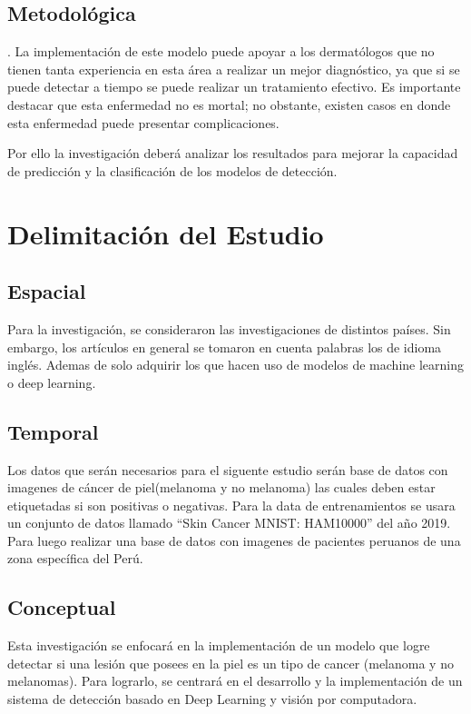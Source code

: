 \subsection{Metodológica}. 
La implementación de este modelo puede apoyar a los dermatólogos que no tienen tanta experiencia en esta área a realizar un mejor diagnóstico, ya que si se puede detectar a tiempo se puede realizar un tratamiento efectivo. Es importante destacar que esta enfermedad no es mortal; no obstante, existen casos en donde esta enfermedad puede presentar complicaciones. 

Por ello la investigación deberá analizar los resultados para mejorar la capacidad de predicción y la clasificación de los modelos de detección.

\section{Delimitación del Estudio}

\subsection{Espacial}
Para la investigación, se consideraron las investigaciones de distintos países. Sin embargo, los artículos en general se tomaron en cuenta palabras los de idioma inglés. Ademas de solo adquirir los que hacen uso de modelos de machine learning o deep learning.

\subsection{Temporal}
Los datos que serán necesarios para el siguente estudio serán base de datos con imagenes de cáncer de piel(melanoma y no melanoma) las cuales deben estar etiquetadas si son positivas o negativas.
Para la data de entrenamientos se usara un conjunto de datos llamado “Skin Cancer MNIST: HAM10000” del año 2019. Para luego realizar una base de datos con imagenes de pacientes peruanos de una zona específica del Perú.


\subsection{Conceptual}
Esta investigación se enfocará en la implementación de un modelo que logre detectar si una lesión que posees en la piel es un tipo de cancer (melanoma y no melanomas). Para lograrlo, se centrará en el desarrollo y la implementación de un sistema de detección basado en Deep Learning y visión por computadora.

